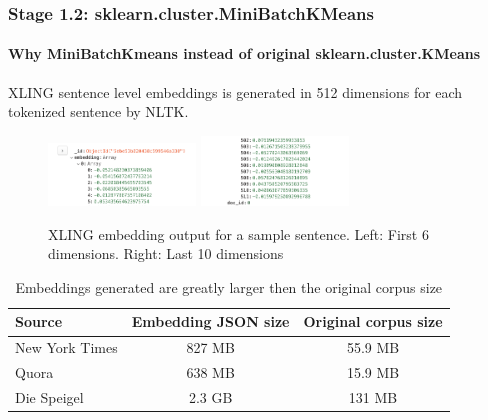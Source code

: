 \documentclass{tum-presentation}
\begin{document}
\begin{frame}[fragile]
  \frametitle{Stage 1.2: sklearn.cluster.MiniBatchKMeans}
  \framesubtitle{Why MiniBatchKmeans instead of original sklearn.cluster.KMeans}
  \begin{description}
    \item XLING sentence level embeddings is generated in 512 dimensions for each tokenized sentence by NLTK.
  \end{description}
  \begin{figure}[t]
    \includegraphics[width=0.35\textwidth]{images/embedding-sample-1.png}
    \includegraphics[width=0.35\textwidth]{images/embedding-sample-2.png}
    \caption{XLING embedding output for a sample sentence. Left: First 6 dimensions. Right: Last 10 dimensions}
  \end{figure}
  \small
  \begin{table}[t]
    \begin{tabular}{lcc}
    \hline
      Source & Embedding JSON size & Original corpus size\\ \hline
      New York Times & 827 MB & 55.9 MB\\
      Quora & 638 MB & 15.9 MB\\
      Die Speigel & 2.3 GB & 131 MB\\
    \hline
    \end{tabular}
    \caption{Embeddings generated are greatly larger then the original corpus size}
  \end{table}
\end{frame}
\end{document}
